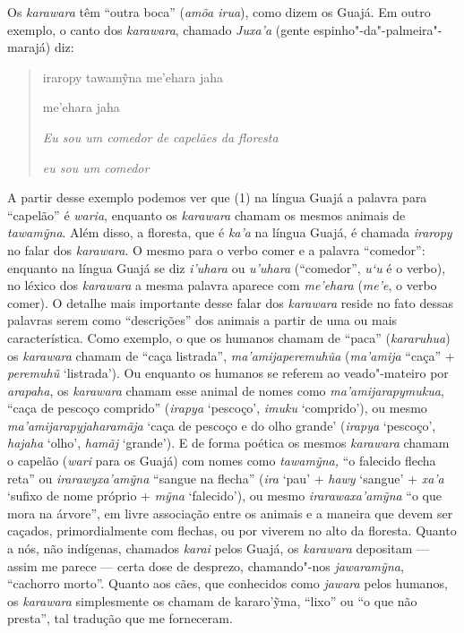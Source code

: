 Os \emph{karawara} têm ``outra boca'' (\emph{amõa irua}), como dizem os
Guajá. Em outro exemplo, o canto dos \emph{karawara}, chamado
\emph{Juxa'a} (gente espinho"-da"-palmeira"-marajá) diz:

\begin{quote}
iraropy tawamỹna me'ehara jaha 

\noindent
me'ehara jaha

\noindent
\emph{}

\noindent
\emph{Eu sou um comedor de capelães da floresta}

\noindent
\emph{eu sou um comedor}
\end{quote}

A partir desse exemplo podemos ver que (1) na língua Guajá a palavra
para ``capelão'' é \emph{waria}, enquanto os \emph{karawara} chamam os
mesmos animais de \emph{tawamỹna}. Além disso, a floresta, que
é \emph{ka'a} na língua Guajá, é chamada \emph{iraropy} no
falar dos \emph{karawara}. O mesmo para o verbo comer e a palavra
``comedor'': enquanto na língua Guajá se diz \emph{i'uhara} ou
\emph{u'uhara} (``comedor'', \emph{u`u} é o verbo), no léxico dos
\emph{karawara} a mesma palavra aparece com \emph{me'ehara}
(\emph{me'e}, o verbo comer). O detalhe mais importante desse falar dos
\emph{karawara} reside no fato dessas palavras serem como ``descrições''
dos animais a partir de uma ou mais característica. Como exemplo, o que
os humanos chamam de ``paca'' (\emph{kararuhua}) os \emph{karawara}
chamam de ``caça listrada'', \emph{ma'amijaperemuhũa} (\emph{ma'amija}
``caça'' + \emph{peremuhũ} `listrada'). Ou enquanto os humanos se
referem ao veado"-mateiro por \emph{arapaha}, os \emph{karawara} chamam
esse animal de nomes como \emph{ma'amijarapymukua}, ``caça de pescoço
comprido'' (\emph{irapya} `pescoço', \emph{imuku} `comprido'), ou mesmo
\emph{ma'amijarapyjaharamãja} `caça de pescoço e do olho grande'
(\emph{irapya} `pescoço', \emph{hajaha} `olho', \emph{hamãj} `grande').
E de forma poética os mesmos \emph{karawara} chamam o capelão
(\emph{wari} para os Guajá) com nomes como \emph{tawamỹna,} ``o falecido
flecha reta'' ou \emph{irarawyxa'amỹna} ``sangue na flecha'' (\emph{ira}
`pau' + \emph{hawy} `sangue' + \emph{xa'a} `sufixo de nome próprio +
\emph{mỹna} `falecido'), ou mesmo \emph{irarawaxa'amỹna} ``o que mora na
árvore'', em livre associação entre os animais e a maneira que devem ser
caçados, primordialmente com flechas, ou por viverem no alto da
floresta. Quanto a nós, não indígenas, chamados \emph{karai} pelos
Guajá, os \emph{karawara} depositam --- assim me parece --- certa dose de
desprezo, chamando"-nos \emph{jawaramỹna}, ``cachorro morto''. Quanto aos
cães, que conhecidos como \emph{jawara} pelos humanos, os
\emph{karawara} simplesmente os chamam de kararo'ỹma, ``lixo'' ou ``o
que não presta'', tal tradução que me forneceram.

